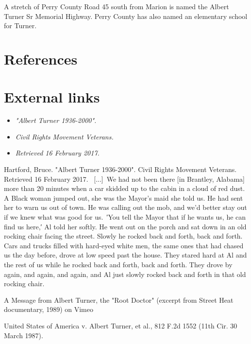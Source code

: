 A stretch of Perry County Road 45 south from Marion is named the Albert
Turner Sr Memorial Highway. Perry County has also named an elementary
school for Turner.

\section{References}\label{references}

\section{External links}\label{external-links}

\begin{itemize}
\item
  \emph{"Albert Turner 1936-2000".}
\item
  \emph{Civil Rights Movement Veterans.}
\item
  \emph{Retrieved 16 February 2017.}
\end{itemize}

Hartford, Bruce. "Albert Turner 1936-2000". Civil Rights Movement
Veterans. Retrieved 16 February 2017. ~{[}...{]}~We had not been there
{[}in Brantley, Alabama{]} more than 20 minutes when a car skidded up to
the cabin in a cloud of red dust. A Black woman jumped out, she was the
Mayor's maid she told us. He had sent her to warn us out of town. He was
calling out the mob, and we'd better stay out if we knew what was good
for us.~′You tell the Mayor that if he wants us, he can find us here,′
Al told her softly. He went out on the porch and sat down in an old
rocking chair facing the street. Slowly he rocked back and forth, back
and forth. Cars and trucks filled with hard-eyed white men, the same
ones that had chased us the day before, drove at low speed past the
house. They stared hard at Al and the rest of us while he rocked back
and forth, back and forth. They drove by again, and again, and again,
and Al just slowly rocked back and forth in that old rocking chair.

A Message from Albert Turner, the "Root Doctor" (excerpt from Street
Heat documentary, 1989) on Vimeo

United States of America v. Albert Turner, et al., 812 F.2d 1552 (11th
Cir. 30 March 1987).
